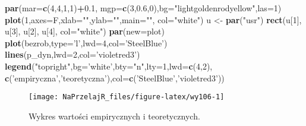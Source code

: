 \documentclass[polish,]{book}
\newenvironment{Shaded}{\begin{snugshade}}{\end{snugshade}}
\newcommand{\DataTypeTok}[1]{\textcolor[rgb]{0.13,0.29,0.53}{#1}}
\newcommand{\DecValTok}[1]{\textcolor[rgb]{0.00,0.00,0.81}{#1}}
\newcommand{\FloatTok}[1]{\textcolor[rgb]{0.00,0.00,0.81}{#1}}
\newcommand{\KeywordTok}[1]{\textcolor[rgb]{0.13,0.29,0.53}{\textbf{#1}}}
\newcommand{\NormalTok}[1]{#1}
\newcommand{\OperatorTok}[1]{\textcolor[rgb]{0.81,0.36,0.00}{\textbf{#1}}}
\newcommand{\StringTok}[1]{\textcolor[rgb]{0.31,0.60,0.02}{#1}}
\begin{document}
\begin{Shaded}
\begin{Highlighting}[]
\KeywordTok{par}\NormalTok{(}\DataTypeTok{mar=}\KeywordTok{c}\NormalTok{(}\DecValTok{4}\NormalTok{,}\DecValTok{4}\NormalTok{,}\DecValTok{1}\NormalTok{,}\DecValTok{1}\NormalTok{)}\OperatorTok{+}\FloatTok{0.1}\NormalTok{, }\DataTypeTok{mgp=}\KeywordTok{c}\NormalTok{(}\DecValTok{3}\NormalTok{,}\FloatTok{0.6}\NormalTok{,}\DecValTok{0}\NormalTok{),}\DataTypeTok{bg=}\StringTok{"lightgoldenrodyellow"}\NormalTok{,}\DataTypeTok{las=}\DecValTok{1}\NormalTok{)}
\KeywordTok{plot}\NormalTok{(}\DecValTok{1}\NormalTok{,}\DataTypeTok{axes=}\NormalTok{F,}\DataTypeTok{xlab=}\StringTok{""}\NormalTok{,}\DataTypeTok{ylab=}\StringTok{""}\NormalTok{,}\DataTypeTok{main=}\StringTok{""}\NormalTok{, }\DataTypeTok{col=}\StringTok{"white"}\NormalTok{)}
\NormalTok{u <-}\StringTok{ }\KeywordTok{par}\NormalTok{(}\StringTok{"usr"}\NormalTok{)}
\KeywordTok{rect}\NormalTok{(u[}\DecValTok{1}\NormalTok{], u[}\DecValTok{3}\NormalTok{], u[}\DecValTok{2}\NormalTok{], u[}\DecValTok{4}\NormalTok{], }\DataTypeTok{col=}\StringTok{"white"}\NormalTok{)}
\KeywordTok{par}\NormalTok{(}\DataTypeTok{new=}\NormalTok{plot)}
\KeywordTok{plot}\NormalTok{(bezrob,}\DataTypeTok{type=}\StringTok{'l'}\NormalTok{,}\DataTypeTok{lwd=}\DecValTok{4}\NormalTok{,}\DataTypeTok{col=}\StringTok{'SteelBlue'}\NormalTok{)}
\KeywordTok{lines}\NormalTok{(p_dyn,}\DataTypeTok{lwd=}\DecValTok{2}\NormalTok{,}\DataTypeTok{col=}\StringTok{'violetred3'}\NormalTok{)}
\KeywordTok{legend}\NormalTok{(}\StringTok{"topright"}\NormalTok{,}\DataTypeTok{bg=}\StringTok{'white'}\NormalTok{,}\DataTypeTok{bty=}\StringTok{"n"}\NormalTok{,}\DataTypeTok{lty=}\DecValTok{1}\NormalTok{,}\DataTypeTok{lwd=}\KeywordTok{c}\NormalTok{(}\DecValTok{4}\NormalTok{,}\DecValTok{2}\NormalTok{),}
\KeywordTok{c}\NormalTok{(}\StringTok{'empiryczna'}\NormalTok{,}\StringTok{'teoretyczna'}\NormalTok{),}\DataTypeTok{col=}\KeywordTok{c}\NormalTok{(}\StringTok{'SteelBlue'}\NormalTok{,}\StringTok{'violetred3'}\NormalTok{))}
\end{Highlighting}
\end{Shaded}

\begin{figure}[h]

{\centering \texttt{[image: NaPrzelajR\_files/figure-latex/wy106-1]} 

}

\caption{Wykres wartości empirycznych i teoretycznych.}\label{fig:wy106}
\end{figure}
\end{document}
